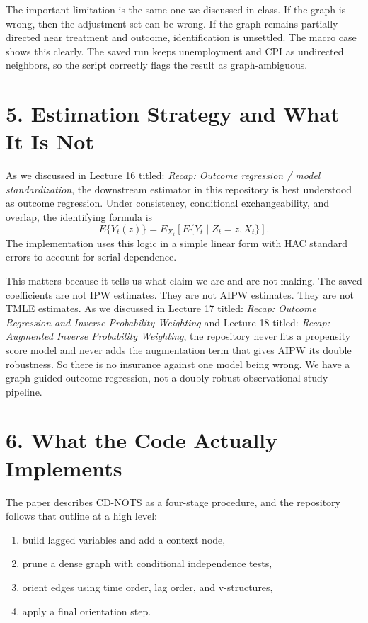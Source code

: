 \documentclass[12pt]{article}
\begin{document}
The important limitation is the same one we discussed in class. If the graph is wrong, then the
adjustment set can be wrong. If the graph remains partially directed near treatment and outcome,
identification is unsettled. The macro case shows this clearly. The saved run keeps unemployment
and CPI as undirected neighbors, so the script correctly flags the result as graph-ambiguous.

\section*{5. Estimation Strategy and What It Is Not}

As we discussed in Lecture 16 titled: \textit{Recap: Outcome regression / model standardization},
the downstream estimator in this repository is best understood as outcome regression. Under
consistency, conditional exchangeability, and overlap, the identifying formula is
\[
E\{Y_t(z)\} = E_{X_t}\left[E\{Y_t \mid Z_t=z, X_t\}\right].
\]
The implementation uses this logic in a simple linear form with HAC standard errors to account for
serial dependence.

This matters because it tells us what claim we are and are not making. The saved coefficients are
not IPW estimates. They are not AIPW estimates. They are not TMLE estimates. As we discussed in
Lecture 17 titled: \textit{Recap: Outcome Regression and Inverse Probability Weighting} and Lecture
18 titled: \textit{Recap: Augmented Inverse Probability Weighting}, the repository never fits a
propensity score model and never adds the augmentation term that gives AIPW its double robustness.
So there is no insurance against one model being wrong. We have a graph-guided outcome regression,
not a doubly robust observational-study pipeline.

\section*{6. What the Code Actually Implements}

The paper describes CD-NOTS as a four-stage procedure, and the repository follows that outline at a
high level:
\begin{enumerate}[leftmargin=1.5em]
\item build lagged variables and add a context node,
\item prune a dense graph with conditional independence tests,
\item orient edges using time order, lag order, and v-structures,
\item apply a final orientation step.
\end{enumerate}
\end{document}
